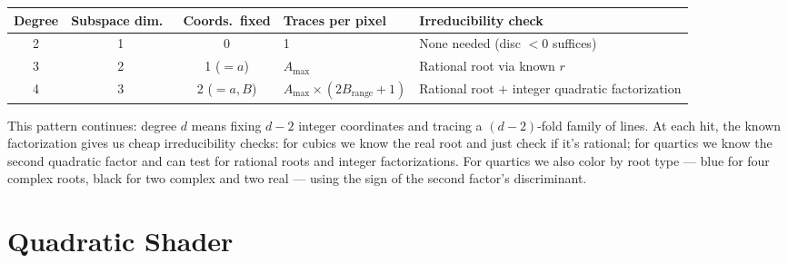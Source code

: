 \documentclass[11pt]{article}
\begin{document}
\begin{center}
\begin{tabular}{ccclp{4.5cm}}
    \toprule
    Degree & Subspace dim.\ & Coords.\ fixed & Traces per pixel & Irreducibility check \\
    \midrule
    2 & 1 & 0 & 1 & None needed (disc $< 0$ suffices) \\
    3 & 2 & 1 ($= a$) & $A_{\max}$ & Rational root via known $r$ \\
    4 & 3 & 2 ($= a, B$) & $A_{\max} \times (2B_{\text{range}} + 1)$ & Rational root $+$ integer quadratic factorization \\
    \bottomrule
\end{tabular}
\end{center}

This pattern continues: degree $d$ means fixing $d - 2$ integer coordinates and tracing a $(d-2)$-fold family of lines.
At each hit, the known factorization gives us cheap irreducibility checks: for cubics we know the real root and just check if it's rational; for quartics we know the second quadratic factor and can test for rational roots and integer factorizations.
For quartics we also color by root type --- blue for four complex roots, black for two complex and two real --- using the sign of the second factor's discriminant.


\appendix

\section{Quadratic Shader}
\label{app:quadratic}
\end{document}
